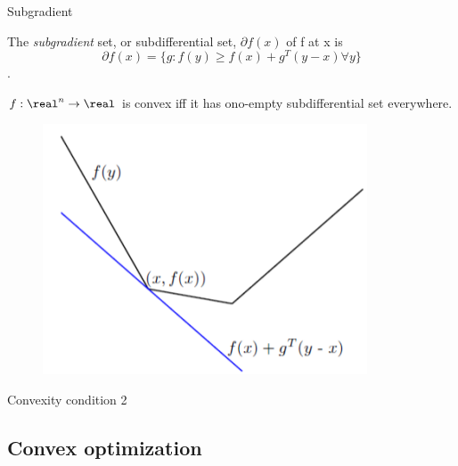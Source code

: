 \documentclass[draft]{beamer}
\begin{document}
\begin{frame}{Subgradient}
	\begin{define}
		The \textit{subgradient} set, or subdifferential set, $\partial f(x)$ of f at x is $$\partial f(x) = \{ g: f(y) \ge f(x) +g^T(y-x) \forall y\}$$. 
	\end{define}
	
	\begin{minipage}{\textwidth}
		\begin{minipage}{.47\textwidth}
			\begin{thm}
				$f:\real^n\rightarrow \real$ is convex iff it has ono-empty subdifferential set everywhere. 
			\end{thm}
		\end{minipage}
		\hfill
		\begin{minipage}{.47\textwidth}
			\begin{figure}
				\includegraphics[width=\textwidth]{2018-03-04-22-37-40.png} 
			\end{figure}
		\end{minipage}
	\end{minipage}
\end{frame} 
\begin{frame}{Convexity condition 2} 
	\begin{thm}
		
	\end{thm}
\end{frame}
\subsection{Convex optimization} 
\end{document}
